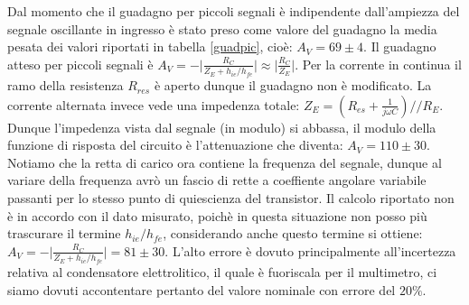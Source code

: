 \documentclass[10pt,a4paper]{article}
\begin{document}
Dal momento che il guadagno per piccoli segnali è indipendente dall'ampiezza del segnale oscillante in ingresso è stato preso come valore del guadagno la media pesata dei valori riportati in tabella \ref{guadpic}, cioè: $A_V = 69 \pm 4$. Il guadagno atteso per piccoli segnali è $A_V=-\vert \frac{R_C}{Z_E+h_{ie}/h_{fe}} \vert \approx \vert \frac{R_C}{Z_E} \vert$. 
Per la corrente in continua il ramo della resistenza $R_{res}$ è aperto dunque il guadagno non è modificato. La corrente alternata invece vede una impedenza totale: $Z_{E} = (R_{es}+\frac{1}{j \omega C})//R_{E}$. Dunque l'impedenza vista dal segnale (in modulo) si abbassa, il modulo della funzione di risposta del circuito è l'attenuazione che diventa: $A_V = 110 \pm 30$. Notiamo che la retta di carico ora contiene la frequenza del segnale, dunque al variare della frequenza avrò un fascio di rette a coeffiente angolare variabile passanti per lo stesso punto di quiescienza del transistor.
Il calcolo riportato non è in accordo con il dato misurato, poichè in questa situazione non posso più trascurare il termine $h_{ie}/h_{fe}$, considerando anche questo termine si ottiene: $A_V =-\vert \frac{R_C}{Z_E+h_{ie}/h_{fe}} \vert = 81 \pm 30$. L'alto errore è dovuto principalmente all'incertezza relativa al condensatore elettrolitico, il quale è fuoriscala per il multimetro, ci siamo dovuti accontentare pertanto del valore nominale con errore del $20\%$.
\end{document}
